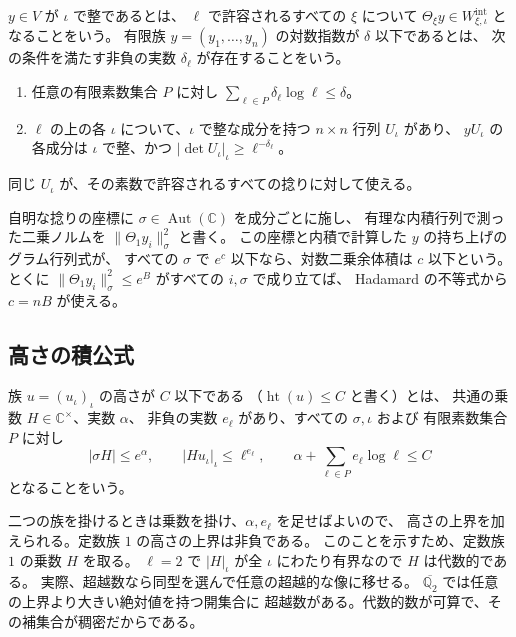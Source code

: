 \begin{definition}
\(y\in V\) が \(\iota\) で整であるとは、
\(\ell\) で許容されるすべての \(\xi\) について
\(\Theta_\xi y\in W^{\mathrm{int}}_{\xi,\iota}\) となることをいう。
有限族 \(y=(y_1,\ldots,y_n)\) の対数指数が \(\delta\) 以下であるとは、
次の条件を満たす非負の実数 \(\delta_\ell\) が存在することをいう。
\begin{enumerate}
\item 任意の有限素数集合 \(P\) に対し
\(\sum_{\ell\in P}\delta_\ell\log\ell\le\delta\)。
\item \(\ell\) の上の各 \(\iota\) について、\(\iota\) で整な成分を持つ
\(n\times n\) 行列 \(U_\iota\) があり、
\(yU_\iota\) の各成分は \(\iota\) で整、かつ
\(|\det U_\iota|_\iota\ge\ell^{-\delta_\ell}\)。
\end{enumerate}
同じ \(U_\iota\) が、その素数で許容されるすべての捻りに対して使える。
\end{definition}

自明な捻りの座標に \(\sigma\in\operatorname{Aut}(\mathbb C)\) を成分ごとに施し、
有理な内積行列で測った二乗ノルムを \(\|\Theta_1 y_i\|_\sigma^2\) と書く。
この座標と内積で計算した \(y\) の持ち上げのグラム行列式が、
すべての \(\sigma\) で \(e^c\) 以下なら、対数二乗余体積は \(c\) 以下という。
とくに \(\|\Theta_1 y_i\|_\sigma^2\le e^B\) がすべての \(i,\sigma\) で成り立てば、
Hadamard の不等式から \(c=nB\) が使える。

\subsection{高さの積公式}

\begin{definition}
族 \(u=(u_\iota)_\iota\) の高さが \(C\) 以下である
（\(\operatorname{ht}(u)\le C\) と書く）とは、
共通の乗数 \(H\in\mathbb C^\times\)、実数 \(\alpha\)、
非負の実数 \(e_\ell\) があり、すべての \(\sigma,\iota\) および
有限素数集合 \(P\) に対し
\[
 |\sigma H|\le e^\alpha,\qquad
 |H u_\iota|_\iota\le\ell^{e_\ell},\qquad
 \alpha+\sum_{\ell\in P} e_\ell\log\ell\le C
\]
となることをいう。
\end{definition}

二つの族を掛けるときは乗数を掛け、\(\alpha,e_\ell\) を足せばよいので、
高さの上界を加えられる。定数族 \(1\) の高さの上界は非負である。
このことを示すため、定数族 \(1\) の乗数 \(H\) を取る。
\(\ell=2\) で \(|H|_\iota\) が全 \(\iota\) にわたり有界なので \(H\) は代数的である。
実際、超越数なら同型を選んで任意の超越的な像に移せる。
\(\overline{\mathbb Q_2}\) では任意の上界より大きい絶対値を持つ開集合に
超越数がある。代数的数が可算で、その補集合が稠密だからである。

